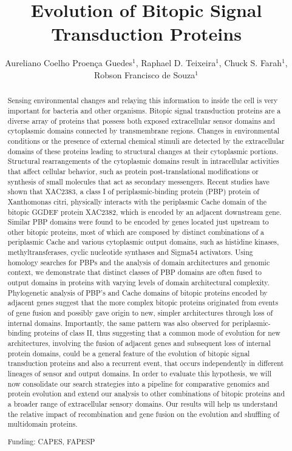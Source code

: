 \documentclass[twoside]{article}
\title{\vspace{-15mm}\fontsize{24pt}{10pt}\selectfont\textbf{Evolution of Bitopic Signal Transduction Proteins}} %
\author{Aureliano Coelho Proen\c{c}a Guedes$^1$, Raphael D. Teixeira$^1$, Chuck S. Farah$^1$, Robson Francisco de Souza$^1$}
\affil{1 USP\\ }
\date{}
\begin{document}
\maketitle %

\thispagestyle{fancy} %


\begin{abstract}
Sensing environmental changes and relaying this information to inside the cell is very important for bacteria and other organisms. Bitopic signal transduction proteins are a diverse array of proteins that possess both exposed extracellular sensor domains and cytoplasmic domains connected by transmembrane regions. Changes in environmental conditions or the presence of external chemical stimuli are detected by the extracellular domains of these proteins leading to structural changes at their cytoplasmic portions. Structural rearrangements of the cytoplasmic domains result in intracellular activities that affect cellular behavior, such as protein post-translational modifications or synthesis of small molecules that act as secondary messengers. Recent studies have shown that XAC2383, a class I of periplasmic-binding protein (PBP) protein of Xanthomonas citri, physically interacts with the periplasmic Cache domain of the bitopic GGDEF protein XAC2382, which is encoded by an adjacent downstream gene.  Similar PBP domains were found to be encoded by genes located just upstream to other bitopic proteins, most of which are composed by distinct combinations of a periplasmic Cache and various cytoplasmic output domains, such as histidine kinases, methyltransferases, cyclic nucleotide synthases and Sigma54 activators. Using homology searches for PBPs and the analysis of domain architectures and genomic context, we demonstrate that distinct classes of PBP domains are often fused to output domains in proteins with varying levels of domain architectural complexity. Phylogenetic analysis of PBP's and Cache domains of bitopic proteins encoded by adjacent genes suggest that the more complex bitopic proteins originated from events of gene fusion and possibly gave origin to new, simpler architectures through loss of internal domains. Importantly, the same pattern was also observed for periplasmic-binding proteins of class II, thus suggesting that a common mode of evolution for new architectures, involving the fusion of adjacent genes and subsequent loss of internal protein domains, could be a general feature of the evolution of bitopic signal transduction proteins and also a recurrent event, that occurs independently in different lineages of sensor and output domains. In order to evaluate this hypothesis, we will now consolidate our search strategies into a pipeline for comparative genomics and protein evolution and extend our analysis to other combinations of bitopic proteins and a broader range of extracellular sensory domains. Our results will help us understand the relative impact of recombination and gene fusion on the evolution and shuffling of multidomain proteins.

Funding: CAPES, FAPESP
\end{abstract}
\end{document}

